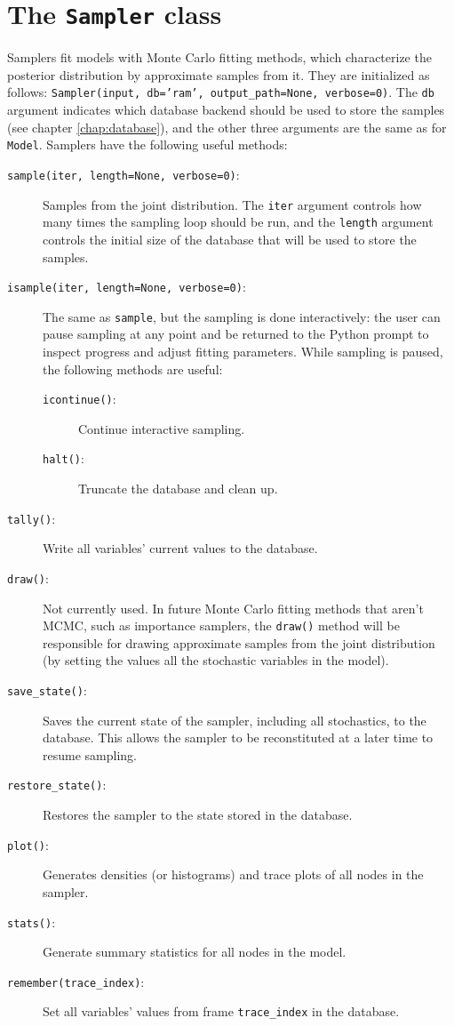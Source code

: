 \section{The \texttt{Sampler} class} 
Samplers fit models with Monte Carlo fitting methods, which characterize the posterior distribution by approximate samples from it. They are initialized as follows: \texttt{Sampler(input, db='ram', output\_path=None, verbose=0)}. The \texttt{db} argument indicates which database backend should be used to store the samples (see chapter \ref{chap:database}), and the other three arguments are the same as for \texttt{Model}. Samplers have the following useful methods:
\begin{description}
    \item[\texttt{sample(iter, length=None, verbose=0)}:] Samples from the joint distribution. The \texttt{iter} argument controls how many times the sampling loop should be run, and the \texttt{length} argument controls the initial size of the database that will be used to store the samples.
    \item[\texttt{isample(iter, length=None, verbose=0)}:] The same as \texttt{sample}, but the sampling is done interactively: the user can pause sampling at any point and be returned to the Python prompt to inspect progress and adjust fitting parameters. While sampling is paused, the following methods are useful: 
    \begin{description}
        \item[\texttt{icontinue()}:] Continue interactive sampling.
        \item[\texttt{halt()}:] Truncate the database and clean up.
    \end{description}
    \item[\texttt{tally()}:] Write all variables' current values to the database.
    \item[\texttt{draw()}:] Not currently used. In future Monte Carlo fitting methods that aren't MCMC, such as importance samplers, the \texttt{draw()} method will be responsible for drawing approximate samples from the joint distribution (by setting the values all the stochastic variables in the model).
    \item[\texttt{save\_state()}:] Saves the current state of the sampler, including all stochastics, to the database. This allows the sampler to be reconstituted at a later time to resume sampling.
    \item[\texttt{restore\_state()}:] Restores the sampler to the state stored in the database.
    \item[\texttt{plot()}:] Generates densities (or histograms) and trace plots of all nodes in the sampler.
	 \item[\texttt{stats()}:] Generate summary statistics for all nodes in the model.
    \item[\texttt{remember(trace\_index)}:] Set all variables' values from frame \texttt{trace\_index} in the database.
\end{description}

